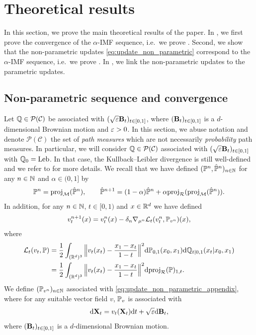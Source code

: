 \documentclass{article}
\begin{document}
\section{Theoretical results}
\label{sec:theoretical_results_appendix}

In this section, we prove the main theoretical results of the paper. In ,
we first prove the convergence of the $\alpha$-IMF sequence, i.e.~we prove . 
Second, we show that the non-parametric updates \eqref{eq:update_non_parametric} correspond to the $\alpha$-IMF sequence, i.e.~we prove . In , we link the non-parametric updates to the parametric updates. 

\subsection{Non-parametric sequence and convergence}
\label{sec:non_parametric_convergence}

Let $\mathbb{Q} \in \mathcal{P}(\mathcal{C})$ be associated with $(\sqrt{\varepsilon} \mathbf{B}_t)_{t \in [0,1]}$, where $(\mathbf{B}_t)_{t \in [0,1]}$ is a $d$-dimensional Brownian motion and $\varepsilon > 0$.
In this section, we abuse notation and denote $\mathcal{P}(\mathcal{C})$ the set of \emph{path measures} which are not necessarily \emph{probability} path measures. In particular, we will consider $\mathbb{Q} \in \mathcal{P}(\mathcal{C})$  associated with $(\sqrt{\varepsilon} \mathbf{B}_t)_{t \in [0,1]}$ with $\mathbb{Q}_0 = \mathrm{Leb}$. In that case, the Kullback--Leibler divergence is still well-defined and we refer to \citep{leonard2014survey} for more details. 
We recall that we have defined $(\mathbb{P}^n, \hat{\mathbb{P}}^n)_{n \in \mathbb{N}}$ for any $n \in \mathbb{N}$ and $\alpha \in (0,1]$ by
\begin{equation}
\label{eq:discretisation_flow_path_measure_repeat}
        \Pbb^n = \projM(\hat{\Pbb}^n) , \qquad \hat{\Pbb}^{n+1} = (1-\alpha) \hat{\Pbb}^n + \alpha \projsimpleR(\projM(\hat{\Pbb}^n)) . 
\end{equation}
In addition, for any $n \in \mathbb{N}$, $t \in [0,1)$ and $x \in \mathbb{R}^d$ we have defined
\begin{equation}
\label{eq:update_non_parametric_appendix_2}
    v^{n+1}_t(x) = v^n_t(x) - \delta_n \nabla_{\mu^n} \Lnonparam_t(v^n_t, \Pbb_{v^n})(x) ,
\end{equation}
 where
\begin{align}\label{eq:locallosst}
    \Lnonparam_t(v_t, \Pbb)&=\frac{1}{2} \int_{(\rset^d)^3} \Big\| v_t(x_t) - \frac{x_1 - x_t}{1 - t} \Big\|^2 \rmd \Pbb_{0,1}(x_0,x_1) \rmd \Qbb_{t|0,1}(x_t | x_0, x_1) \\
    &=\frac{1}{2}  \int_{(\rset^d)^3} \Big\| v_t(x_t) - \frac{x_1 - x_t}{1 - t} \Big\|^2 \rmd \projsimpleR(\Pbb)_{1,t}.
\end{align}
We define $(\mathbb{P}_{v^n})_{n \in \mathbb{N}}$ associated with \eqref{eq:update_non_parametric_appendix}, where for any suitable vector field $v$, $\mathbb{P}_v$ is associated with 
\begin{equation}
    \mathrm{d} \mathbf{X}_t = v_t(\mathbf{X}_t) \mathrm{d} t + \sqrt{\varepsilon} \mathrm{d} \mathbf{B}_t ,
\end{equation}
where $(\mathbf{B}_t)_{t \in [0,1]}$ is a $d$-dimensional Brownian motion.
\end{document}

